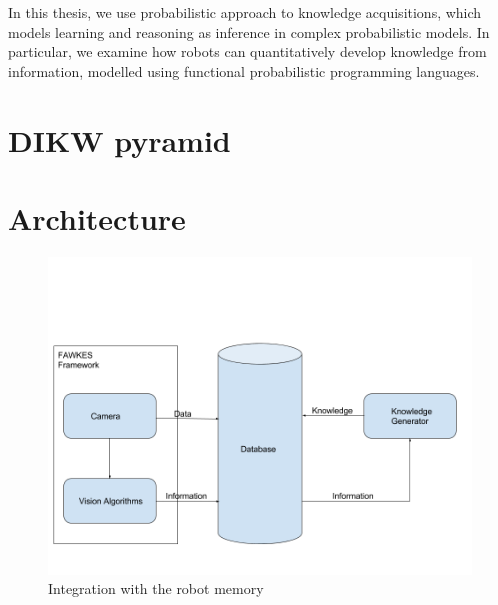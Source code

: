 In this thesis, we use probabilistic approach to knowledge acquisitions, which models learning and reasoning as inference in complex probabilistic models. In particular, we examine how robots can quantitatively  develop knowledge from information,  modelled using  functional probabilistic programming languages. 


\section{DIKW pyramid}

\section{Architecture}
\label{cha:}
\begin{figure}[htp]
\centering
\includegraphics[width=\textwidth]{images/integration.png}
\caption{Integration with the robot memory}
\label{}
\end{figure}


